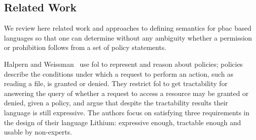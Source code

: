 \documentclass[runningheads,a4paper]{llncs}
\begin{document}
\subsection{Related Work}
We review here related work and approaches
to defining semantics for \ac{pbac} based languages so that one can
determine without any ambiguity whether a permission or prohibition
follows from a set of policy statements.
 
Halpern and Weissman~\cite{Halpern2008} use \ac{fol} to represent and reason about policies; policies describe the conditions under which a request to perform an action, such as reading a file, is granted or denied. They restrict \ac{fol} to get tractability for answering the query of whether a request to access a resource may be granted or denied, given a policy, and argue that despite the tractability results their language is still expressive. The authors focus on satisfying three requirements in the design of their language Lithium: expressive enough, tractable enough and usable by non-experts.

%

\end{document}

